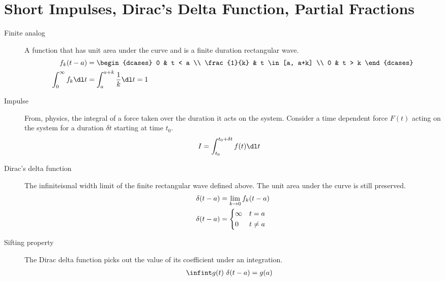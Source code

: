 \section{Short Impulses, Dirac's Delta Function, Partial Fractions}
\begin{description}
    \item[Finite analog] A function that has unit area under the curve and is a finite
        duration rectangular wave.
        \begin{align}
            f_k(t-a)                    & =
            \begin{dcases}
                0           & t < a          \\
                \frac{1}{k} & t \in [a, a+k] \\
                0           & t > k
            \end{dcases}                                        \\
            \int_{0}^{\infty} f_k \dl t & =\int_{a}^{a+k} \frac{1}{k} \dl t = 1
        \end{align}
    \item[Impulse] From, physics, the integral of a force taken over the duration
        it acts on the system. Consider a time dependent force $ F(t) $ acting on the
        system for a duration $ \delta t $ starting at time $ t_0 $.
        \begin{align}
            I & = \int_{t_0}^{t_0 + \delta t} f(t) \dl t
        \end{align}
    \item[Dirac's delta function] The infiniteismal width limit of the finite
        rectangular wave defined above. The unit area under the curve is still preserved.
        \begin{align}
            \delta(t-a) & = \lim_{k \to 0} f_k (t - a) \\
            \delta(t-a) & = \begin{dcases}
                                \infty & t = a    \\
                                0      & t \neq a
                            \end{dcases}
        \end{align}
    \item[Sifting property] The Dirac delta function picks out the value of its
        coefficient under an integration.
        \begin{align}
            \infint g(t)\ \delta(t-a) & = g(a)
        \end{align}

\end{description}
